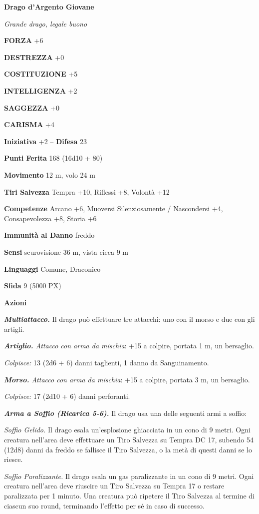 \begin{multicols}{2}
\medskip{}\textbf{Drago d'Argento Giovane}

\textit{Grande drago, legale buono}

\textbf{FORZA} +6

\textbf{DESTREZZA} +0

\textbf{COSTITUZIONE} +5

\textbf{INTELLIGENZA} +2

\textbf{SAGGEZZA} +0

\textbf{CARISMA} +4

\textbf{Iniziativa} +2 -- \textbf{Difesa} 23

\textbf{Punti Ferita} 168 (16d10 + 80)

\textbf{Movimento} 12 m, volo 24 m

\textbf{Tiri Salvezza} Tempra +10, Riflessi +8, Volontà +12

\textbf{Competenze} Arcano +6, Muoversi Silenziosamente / Nascondersi +4, Consapevolezza +8, Storia +6

\textbf{Immunità al Danno} freddo

\textbf{Sensi} scurovisione 36 m, vista cieca 9 m

\textbf{Linguaggi} Comune, Draconico

\textbf{Sfida} 9 (5000 PX)

\textbf{Azioni}

\textit{\textbf{Multiattacco.}} Il drago può effettuare tre attacchi: uno con il morso e due con gli artigli.

\textit{\textbf{Artiglio.} Attacco con arma da mischia}: +15 a colpire, portata 1 m, un bersaglio.

\textit{Colpisce:} 13 (2d6 + 6) danni taglienti, 1 danno da Sanguinamento.

\textit{\textbf{Morso.} Attacco con arma da mischia}: +15 a colpire, portata 3 m, un bersaglio.

\textit{Colpisce:} 17 (2d10 + 6) danni perforanti.

\textit{\textbf{Arma a Soffio (Ricarica 5-6).}} Il drago usa una delle seguenti armi a soffio:

\textit{Soffio Gelido.} Il drago esala un'esplosione ghiacciata in un cono di 9 metri. Ogni creatura nell'area deve effettuare un Tiro Salvezza su Tempra DC 17, subendo 54 (12d8) danni da freddo se fallisce il Tiro Salvezza, o la metà di questi danni se lo riesce.

\textit{Soffio Paralizzante.} Il drago esala un gas paralizzante in un cono di 9 metri. Ogni creatura nell'area deve riuscire un Tiro Salvezza su Tempra 17 o restare paralizzata per 1 minuto. Una creatura può ripetere il Tiro Salvezza al termine di ciascun suo round, terminando l'effetto per sé in caso di successo.


\end{multicols}
